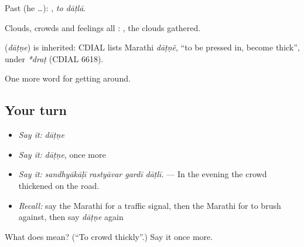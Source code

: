 Past (he …):  , \emph{to dāṭlā}.

Clouds, crowds and feelings all :  , the clouds gathered.

\begin{cousinweb}
\textbf{} (\emph{dāṭṇe}) is inherited: CDIAL lists Marathi \emph{dāṭṇẽ}, \textquotedblleft{}to be pressed in, become thick\textquotedblright{}, under \emph{*draṭ} (CDIAL 6618).
\end{cousinweb}

\begin{grammarlens}[title={What you've built}]
One more word for getting around.
\end{grammarlens}

\subsection*{Your turn}
\begin{itemize}
\raggedright
  \item \emph{Say it:} \emph{dāṭṇe}
  \item \emph{Say it:} \emph{dāṭṇe}, once more
  \item \emph{Say it:} \emph{sandhyākāḷī rastyāvar gardī dāṭlī.} — In the evening the crowd thickened on the road.
  \item \emph{Recall:} say the Marathi for a traffic signal, then the Marathi for to brush against, then say \emph{dāṭṇe} again
\end{itemize}

\begin{tcolorbox}[breakable,colback=teal!4,colframe=teal!35!black,title={Before you move on}]
What does  mean? (\textquotedblleft{}To crowd thickly\textquotedblright{}.) Say it once more.
\end{tcolorbox}
